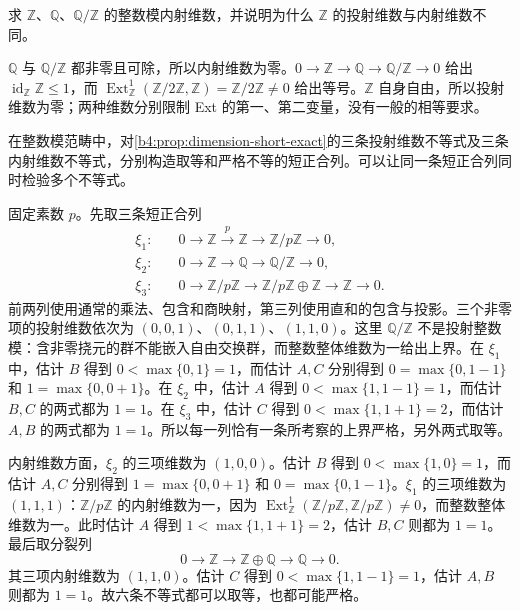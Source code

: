 \begin{exercise}\label{b4:ex:10-injective-dimension-integers}
	求 \(\mathbb Z\)、\(\mathbb Q\)、\(\mathbb Q/\mathbb Z\) 的整数模内射维数，并说明为什么 \(\mathbb Z\) 的投射维数与内射维数不同。
\end{exercise}
\begin{solution}
	\(\mathbb Q\) 与 \(\mathbb Q/\mathbb Z\) 都非零且可除，所以内射维数为零。\(0\to\mathbb Z\to\mathbb Q\to\mathbb Q/\mathbb Z\to0\) 给出 \(\operatorname{id}_{\mathbb Z}\mathbb Z\le1\)，而 \(\operatorname{Ext}_{\mathbb Z}^1(\mathbb Z/2\mathbb Z,\mathbb Z)=\mathbb Z/2\mathbb Z\ne0\) 给出等号。\(\mathbb Z\) 自身自由，所以投射维数为零；两种维数分别限制 Ext 的第一、第二变量，没有一般的相等要求。
\end{solution}

\begin{exercise}\label{b4:ex:10-dimension-bounds-sharpness}
	在整数模范畴中，对\cref{b4:prop:dimension-short-exact}的三条投射维数不等式及三条内射维数不等式，分别构造取等和严格不等的短正合列。可以让同一条短正合列同时检验多个不等式。
\end{exercise}
\begin{solution}
	固定素数 \(p\)。先取三条短正合列
	\[
		\begin{aligned}
			\xi_1:&\quad0\longrightarrow\mathbb Z\xrightarrow{\,p\,}\mathbb Z \longrightarrow\mathbb Z/p\mathbb Z\longrightarrow0,\\
			\xi_2:&\quad0\longrightarrow\mathbb Z\longrightarrow\mathbb Q \longrightarrow\mathbb Q/\mathbb Z\longrightarrow0,\\
			\xi_3:&\quad0\longrightarrow\mathbb Z/p\mathbb Z\longrightarrow\mathbb Z/p\mathbb Z\oplus\mathbb Z \longrightarrow\mathbb Z\longrightarrow0.
		\end{aligned}
	\]
	前两列使用通常的乘法、包含和商映射，第三列使用直和的包含与投影。三个非零项的投射维数依次为 \((0,0,1)\)、\((0,1,1)\)、\((1,1,0)\)。这里 \(\mathbb Q/\mathbb Z\) 不是投射整数模：含非零挠元的群不能嵌入自由交换群，而整数整体维数为一给出上界。在 \(\xi_1\) 中，估计 \(B\) 得到 \(0<\max\{0,1\}=1\)，而估计 \(A,C\) 分别得到 \(0=\max\{0,1-1\}\) 和 \(1=\max\{0,0+1\}\)。在 \(\xi_2\) 中，估计 \(A\) 得到 \(0<\max\{1,1-1\}=1\)，而估计 \(B,C\) 的两式都为 \(1=1\)。在 \(\xi_3\) 中，估计 \(C\) 得到 \(0<\max\{1,1+1\}=2\)，而估计 \(A,B\) 的两式都为 \(1=1\)。所以每一列恰有一条所考察的上界严格，另外两式取等。

	内射维数方面，\(\xi_2\) 的三项维数为 \((1,0,0)\)。估计 \(B\) 得到 \(0<\max\{1,0\}=1\)，而估计 \(A,C\) 分别得到 \(1=\max\{0,0+1\}\) 和 \(0=\max\{0,1-1\}\)。\(\xi_1\) 的三项维数为 \((1,1,1)\)：\(\mathbb Z/p\mathbb Z\) 的内射维数为一，因为 \(\operatorname{Ext}_{\mathbb Z}^1(\mathbb Z/p\mathbb Z,\mathbb Z/p\mathbb Z)\ne0\)，而整数整体维数为一。此时估计 \(A\) 得到 \(1<\max\{1,1+1\}=2\)，估计 \(B,C\) 则都为 \(1=1\)。最后取分裂列
	\[
		0\longrightarrow\mathbb Z\longrightarrow\mathbb Z\oplus\mathbb Q \longrightarrow\mathbb Q\longrightarrow0.
	\]
	其三项内射维数为 \((1,1,0)\)。估计 \(C\) 得到 \(0<\max\{1,1-1\}=1\)，估计 \(A,B\) 则都为 \(1=1\)。故六条不等式都可以取等，也都可能严格。
\end{solution}
